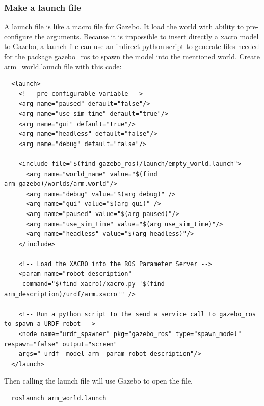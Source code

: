 \documentclass[pdftex,12pt,a4paper]{article}
\begin{document}
  \subsubsection{Make a launch file}
  A launch file is like a macro file for Gazebo. It load the world with ability to pre-configure the arguments. Because it is impossible to insert directly a xacro model to Gazebo, a launch file can use an indirect python script to generate files needed for the package gazebo\_ros to spawn the model into the mentioned world. Create arm\_world.launch file with this code:
  \begin{lstlisting}
  <launch>
    <!-- pre-configurable variable -->
    <arg name="paused" default="false"/>
    <arg name="use_sim_time" default="true"/>
    <arg name="gui" default="true"/>
    <arg name="headless" default="false"/>
    <arg name="debug" default="false"/>
  
    <include file="$(find gazebo_ros)/launch/empty_world.launch">
      <arg name="world_name" value="$(find arm_gazebo)/worlds/arm.world"/>
      <arg name="debug" value="$(arg debug)" />
      <arg name="gui" value="$(arg gui)" />
      <arg name="paused" value="$(arg paused)"/>
      <arg name="use_sim_time" value="$(arg use_sim_time)"/>
      <arg name="headless" value="$(arg headless)"/>
    </include>
  
    <!-- Load the XACRO into the ROS Parameter Server -->
    <param name="robot_description"
  	 command="$(find xacro)/xacro.py '$(find arm_description)/urdf/arm.xacro'" />
  
    <!-- Run a python script to the send a service call to gazebo_ros to spawn a URDF robot -->
    <node name="urdf_spawner" pkg="gazebo_ros" type="spawn_model" respawn="false" output="screen"
  	args="-urdf -model arm -param robot_description"/>
  </launch>
  \end{lstlisting}
  Then calling the launch file will use Gazebo to open the file.
  \begin{lstlisting}
  roslaunch arm_world.launch
  \end{lstlisting}
  
  \newpage
\end{document}
